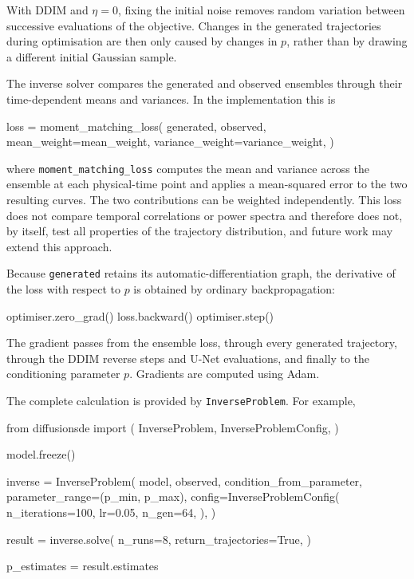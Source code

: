 With DDIM and $\eta=0$, fixing the initial noise removes random variation between successive evaluations of the objective. Changes in the generated trajectories during optimisation are then only caused by changes in $p$, rather than by drawing a different initial Gaussian sample.

The inverse solver compares the generated and observed ensembles through their time-dependent means and variances. In the implementation this is

\begin{pythonlisting}
loss = moment_matching_loss(
    generated,
    observed,
    mean_weight=mean_weight,
    variance_weight=variance_weight,
)
\end{pythonlisting}
where \texttt{moment\_matching\_loss} computes the mean and variance across the ensemble at each physical-time point and applies a mean-squared error to the two resulting curves. The two contributions can be weighted independently. This loss does not compare temporal correlations or power spectra and therefore does not, by itself, test all properties of the trajectory distribution, and future work may extend this approach.

Because \texttt{generated} retains its automatic-differentiation graph, the derivative of the loss with respect to $p$ is obtained by ordinary backpropagation:

\begin{pythonlisting}
optimiser.zero_grad()
loss.backward()
optimiser.step()
\end{pythonlisting}

The gradient passes from the ensemble loss, through every generated trajectory, through the DDIM reverse steps and U-Net evaluations, and finally to the conditioning parameter $p$. Gradients are computed using Adam.

The complete calculation is provided by \texttt{InverseProblem}. For example,

\begin{pythonlisting}
from diffusionsde import (
    InverseProblem,
    InverseProblemConfig,
)

model.freeze()

inverse = InverseProblem(
    model,
    observed,
    condition_from_parameter,
    parameter_range=(p_min, p_max),
    config=InverseProblemConfig(
        n_iterations=100,
        lr=0.05,
        n_gen=64,
    ),
)

result = inverse.solve(
    n_runs=8,
    return_trajectories=True,
)

p_estimates = result.estimates
\end{pythonlisting}

